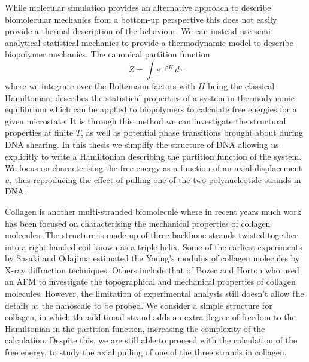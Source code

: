 While molecular simulation provides an alternative approach to describe biomolecular mechanics from a bottom-up perspective this does not easily provide a thermal description of the behaviour. We can instead use semi-analytical statistical mechanics to provide a thermodynamic model to describe biopolymer mechanics. The canonical partition function
%
\begin{equation}
\label{partition_function}
Z=\int e^{-\beta H}\, d\tau
\end{equation}
%
where we integrate over the Boltzmann factors with $H$ being the classical Hamiltonian, describes the statistical properties of a system in thermodynamic equilibrium which can be applied to biopolymers to calculate free energies for a given microstate.  It is through this method we can investigate the structural properties at finite $T$, as well as potential phase transitions brought about during DNA shearing. In this thesis we simplify the structure of DNA allowing us explicitly to write a Hamiltonian describing the partition function of the system. We focus on characterising the free energy as a function of an axial displacement $u$, thus reproducing the effect of pulling one of the two polynucleotide strands in DNA.  

Collagen is another multi-stranded biomolecule where in recent years much work has been focused on characterising the mechanical properties of collagen molecules. The structure is made up of three backbone strands twisted together into a right-handed coil known as a triple helix. Some of the earliest experiments by Sasaki and Odajima \cite{Sasaki1996} estimated the Young's modulus of collagen molecules by X-ray diffraction techniques. Others include that of Bozec and Horton \cite{Bozec2005a,Wenger2007} who used an AFM to investigate the topographical and mechanical properties of collagen molecules. However, the limitation of experimental analysis still doesn't allow the details at the nanoscale to be probed. We consider a simple structure for collagen, in which the additional strand adds an extra degree of freedom to the Hamiltonian in the partition function, increasing the complexity of the calculation. Despite this, we are still able to proceed with the calculation of the free energy, to study the axial pulling of one of the three strands in collagen. 

